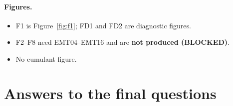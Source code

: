 \documentclass[10pt,a4paper]{article}
\begin{document}
\paragraph{Figures.}
\begin{itemize}
\item F1 is Figure~\ref{fig:f1}; FD1 and FD2 are diagnostic figures.
\item F2--F8 need EMT04--EMT16 and are \textbf{not produced (BLOCKED)}.
\item No cumulant figure.
\end{itemize}

\section*{Answers to the final questions}
\end{document}
